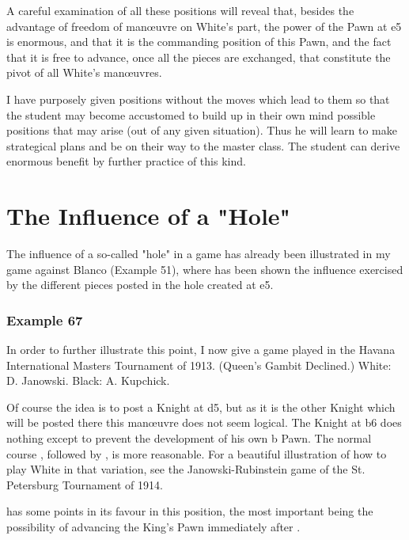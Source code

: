 \documentclass[11pt,a4paper]{book}
\begin{document}
A careful examination of all these positions will reveal that, besides the advantage of freedom of manœuvre on White's part, the power of the Pawn at e5 is enormous, and that it is the commanding position of this Pawn, and the fact that it is free to advance, once all the pieces are exchanged, that constitute the pivot of all White's manœuvres.

I have purposely given positions without the moves which lead to them so that the student may become accustomed to build up in their own mind possible positions that may arise (out of any given situation). Thus he will learn to make strategical plans and be on their way to the master class. The student can derive enormous benefit by further practice of this kind.

\section{The Influence of a "Hole"}

The influence of a so-called "hole" in a game has already been illustrated in my game against Blanco (Example 51), where has been shown the influence exercised by the different pieces posted in the hole created at e5.

\subsubsection*{Example 67}

In order to further illustrate this point, I now give a game played in the Havana International Masters Tournament of 1913. (Queen's Gambit Declined.) White: D. Janowski. Black: A. Kupchick.

\newgame

 Of course the idea is to post a Knight at d5, but as it is the other Knight which will be posted there this manœuvre does not seem logical. The Knight at b6 does nothing except to prevent the development of his own b Pawn. The normal course , followed by , is more reasonable. For a beautiful illustration of how to play White in that variation, see the Janowski-Rubinstein game of the St. Petersburg Tournament of 1914.

  has some points in its favour in this position, the most important being the possibility of advancing the King's Pawn immediately after .
\end{document}
